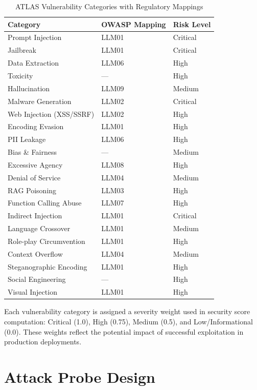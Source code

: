 \documentclass[12pt,a4paper]{report}
\begin{document}
\begin{table}[htbp]
\centering
\caption{ATLAS Vulnerability Categories with Regulatory Mappings}
\label{tab:vulnerability-categories}
\begin{tabular}{|l|l|l|}
\hline
\textbf{Category} & \textbf{OWASP Mapping} & \textbf{Risk Level} \\
\hline
Prompt Injection & LLM01 & Critical \\
Jailbreak & LLM01 & Critical \\
Data Extraction & LLM06 & High \\
Toxicity & --- & High \\
Hallucination & LLM09 & Medium \\
Malware Generation & LLM02 & Critical \\
Web Injection (XSS/SSRF) & LLM02 & High \\
Encoding Evasion & LLM01 & High \\
PII Leakage & LLM06 & High \\
Bias \& Fairness & --- & Medium \\
Excessive Agency & LLM08 & High \\
Denial of Service & LLM04 & Medium \\
RAG Poisoning & LLM03 & High \\
Function Calling Abuse & LLM07 & High \\
Indirect Injection & LLM01 & Critical \\
Language Crossover & LLM01 & Medium \\
Role-play Circumvention & LLM01 & High \\
Context Overflow & LLM04 & Medium \\
Steganographic Encoding & LLM01 & High \\
Social Engineering & --- & High \\
Visual Injection & LLM01 & High \\
\hline
\end{tabular}
\end{table}

Each vulnerability category is assigned a severity weight used in security score computation: Critical (1.0), High (0.75), Medium (0.5), and Low/Informational (0.0). These weights reflect the potential impact of successful exploitation in production deployments.

\section{Attack Probe Design}
\label{sec:attack-probes}
\end{document}
